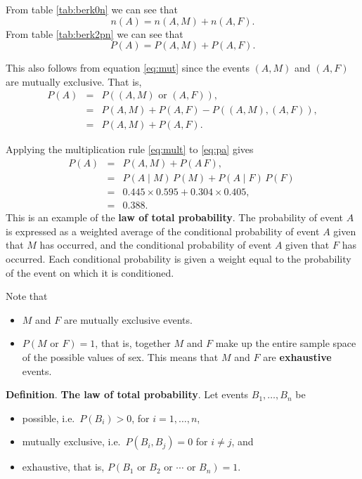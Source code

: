 \documentclass[
  british,
]{book}
\providecommand{\tightlist}{%
  \setlength{\itemsep}{0pt}\setlength{\parskip}{0pt}}
\begin{document}
From table \ref{tab:berk0n} we can see that
\[ n(A) = n(A , M) + n(A , F). \]
From table \ref{tab:berk2pn} we can see that
\begin{equation}
P(A) = P(A , M) + P(A , F). 
\label{eq:pa}
\end{equation}

This also follows from equation \eqref{eq:mut} since the events \((A , M)\) and \((A , F)\) are mutually exclusive. That is,
\begin{eqnarray}
 P(A) &=& P((A , M) \mbox{ or } (A , F) ), \\
 &=& P(A , M) + P(A , F) - P((A , M) , (A , F)), \\
 &=& P(A , M) + P(A , F). 
\end{eqnarray}

Applying the multiplication rule \eqref{eq:mult} to \eqref{eq:pa} gives
\begin{eqnarray}
P(A) &=& P(A , M) + P(A \, F), \\
     &=& P(A \mid M)\,P(M) + P(A \mid F)\,P(F)\ \\
     &=& 0.445 \times 0.595 + 0.304 \times 0.405, \\
     &=& 0.388.
\end{eqnarray}
This is an example of the \textbf{law of total probability}. The probability of event \(A\) is expressed as a weighted average of the conditional probability of event \(A\) given that \(M\) has occurred, and the conditional probability of event \(A\) given that \(F\) has occurred. Each conditional probability is given a weight equal to the probability of the event on which it is conditioned.

Note that

\begin{itemize}
\tightlist
\item
  \(M\) and \(F\) are mutually exclusive events.
\item
  \(P(M \mbox{ or } F) = 1\), that is, together \(M\) and \(F\) make up the entire sample space of the possible values of sex. This means that \(M\) and \(F\) are \textbf{exhaustive} events.
\end{itemize}

\textbf{Definition}. \textbf{The law of total probability}. Let events \(B_1,\ldots,B_n\) be

\begin{itemize}
\tightlist
\item
  possible, i.e.~\(P(B_i) > 0\), for \(i = 1, \ldots, n\),
\item
  mutually exclusive, i.e.~\(P(B_i , B_j)=0\) for \(i \neq j\), and
\item
  exhaustive, that is, \(P(B_1 \mbox{ or } B_2 \mbox{ or } \cdots \mbox{ or } B_n) = 1\).
\end{itemize}
\end{document}

